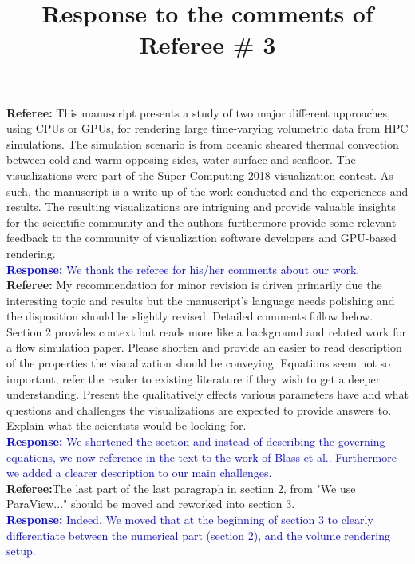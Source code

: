 \documentclass[]{article}
\title{Response to the comments of Referee \# 3}
\begin{document}
\maketitle
\textbf{Referee:} This manuscript presents a study of two major different approaches, using CPUs or GPUs, for rendering large time-varying volumetric data from HPC simulations. The simulation scenario is from oceanic sheared thermal convection between cold and warm opposing sides, water surface and seafloor. The visualizations were part of the Super Computing 2018 visualization contest. As such, the manuscript is a write-up of the work conducted and the experiences and results.
The resulting visualizations are intriguing and provide valuable insights for the scientific community and the authors furthermore provide some relevant feedback to the community of visualization software developers and GPU-based rendering. \\

\textcolor{blue}{\textbf{Response:} We thank the referee for his/her comments about our work.} \\

\textbf{Referee:} My recommendation for minor revision is driven primarily due the interesting topic and results but the manuscript's language needs polishing and the disposition should be slightly revised. Detailed comments follow below.
Section 2 provides context but reads more like a background and related work for a flow simulation paper. Please shorten and provide an easier to read description of the properties the visualization should be conveying. Equations seem not so important, refer the reader to existing literature if they wish to get a deeper understanding. Present the qualitatively effects various parameters have and what questions and challenges the visualizations are expected to provide answers to. Explain what the scientists would be looking for. \\

\textcolor{blue}{\textbf{Response:} We shortened the section and instead of describing the governing equations, we now reference in the text to the work of Blass et al.\cite{bla19}. Furthermore we added a clearer description to our main challenges.} \\

\textbf{Referee:}The last part of the last paragraph in section 2, from "We use ParaView..." should be moved and reworked into section 3. \\

\textcolor{blue}{\textbf{Response:} Indeed. We moved that at the beginning of section 3 to clearly differentiate between the numerical part (section 2), and the volume rendering setup.} \\
\end{document}
